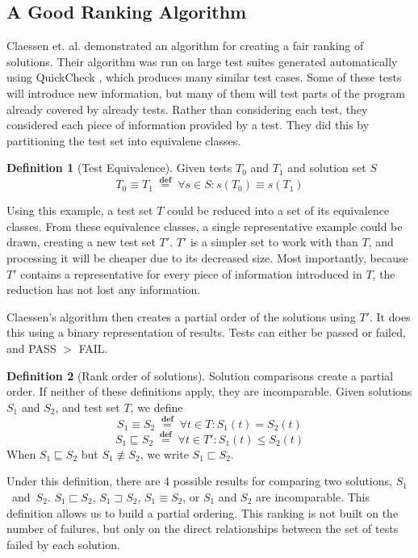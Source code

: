 \documentclass[11pt,twoside]{article}
\newcommand\defined{\mathrel{\;\stackrel{\scriptscriptstyle\mathbf{def}}{=}\;}}
\theoremstyle{definition}
\newtheorem{defn}{Definition}
\let\cite=\citep
\begin{document}
\subsection{A Good Ranking Algorithm}
Claessen et. al. demonstrated an algorithm for creating a fair ranking of solutions\cite{Claessen}. Their algorithm was run on large test suites generated automatically using QuickCheck \cite{QuickCheck}, which produces many similar test cases. Some of these tests will introduce new information, but many of them will test parts of the program already covered by already tests. Rather than considering each test, they considered each piece of information provided by a test. They did this by partitioning the test set into equivalene classes. 

\begin{defn}[Test Equivalence]
Given tests $T_0$ and $T_1$ and solution set $S$
$$ T_0 \equiv T_1 \defined \forall s \in S : s(T_0) \equiv s(T_1) $$
\end{defn}


Using this example, a test set $T$ could be reduced into a set of its equivalence classes. From these equivalence classes, a single representative example could be drawn, creating a new test set $T'$. $T'$ is a simpler set to work with than $T$, and processing it will be cheaper due to its decreased size. Most importantly, because $T'$ contains a representative for every piece of information introduced in $T$, the reduction has not lost any information.


Claessen's algorithm then creates a partial order of the solutions using $T'$. It does this using a binary representation of results. Tests can either be passed or failed, and PASS $>$ FAIL.

\begin{defn}[Rank order of solutions]
Solution comparisons create a partial order. If neither of these definitions apply, they are incomparable.
Given solutions $S_1$ and $S_2$, and test set $T$, we define
$$S_1 \equiv S_2 \defined \forall t \in T : S_1(t) = S_2(t)$$
$$S_1 \sqsubseteq S_2 \defined \forall t \in T' : S_1(t) \leq S_2(t)$$
When $S_1 \sqsubseteq S_2$ but $S_1 \not\equiv S_2$, we write
$S_1 \sqsubset S_2$.
\end{defn}
Under this definition, there are 4 possible results for comparing two solutions, $S_1$~and~$S_2$. 
$S_1 \sqsubset S_2$, $S_1 \sqsupset S_2$, $S_1 \equiv S_2$, or $S_1$ and $S_2$  are incomparable. This definition allows us to build a partial ordering. This ranking is not built on the number of failures, but only on the direct relationships between the set of tests failed by each solution.
\end{document}
